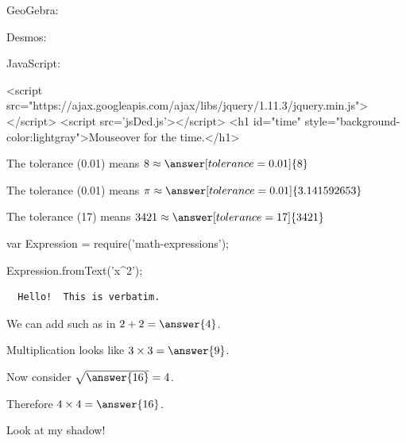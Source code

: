 \documentclass{ximera}
\begin{document}
GeoGebra:

Desmos:

JavaScript:
\begin{html}
<script src="https://ajax.googleapis.com/ajax/libs/jquery/1.11.3/jquery.min.js"></script>
<script src='jsDed.js'></script>
<h1 id="time" style="background-color:lightgray">Mouseover for the time.</h1>
\end{html}

\begin{problem}
  The tolerance (0.01) means $8 \approx \answer[tolerance=0.01]{8}$
\end{problem}

\begin{problem}
  The tolerance (0.01) means $\pi \approx \answer[tolerance=0.01]{3.141592653}$
\end{problem}

\begin{problem}
  The tolerance (17) means $3421 \approx \answer[tolerance=17]{3421}$
\end{problem}

\begin{code}
  var Expression = require('math-expressions');

  Expression.fromText('x^2');
\end{code}

\begin{verbatim}
  Hello!  This is verbatim.
\end{verbatim}

\begin{problem}
  We can add such as in $2 + 2 = \answer{4}$.
  
  \begin{problem}
    Multiplication looks like $3 \times 3 = \answer{9}$.
    
    \begin{problem}
      Now consider $\sqrt{\answer{16}} = 4$.
      
      \begin{problem}
        Therefore $4 \times 4 = \answer{16}$.
      \end{problem}
    \end{problem}
  \end{problem}
\end{problem}

\begin{theorem}
Look at my shadow!
\end{theorem}
\end{document}
